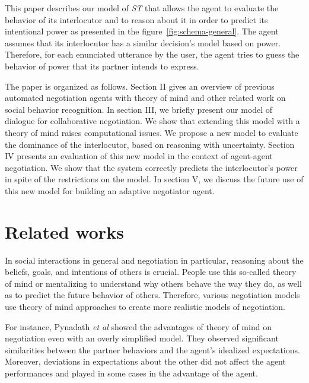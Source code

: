 \documentclass[conference, letterpaper]{IEEEtran}
\begin{document}
		This paper describes our model of \emph{ST} that allows the agent to evaluate the behavior of its interlocutor and to reason about it in order to predict its intentional power as presented in the figure~\ref{fig:schema-general}. The agent assumes that its interlocutor has a similar decision's model based on power. Therefore, for each enunciated utterance by the user, the agent tries to guess the behavior of power that its partner intends to express. 

		The paper is organized as follows. Section II gives an overview of previous automated negotiation agents with theory of mind and other related work on social behavior recognition. In section III, we briefly present our model of dialogue for collaborative negotiation. We show that extending this model with a theory of mind raises computational issues. We propose a new model to evaluate the dominance of the interlocutor, based on reasoning with uncertainty. Section IV presents an evaluation of this new model in the context of agent-agent negotiation. We show that the system correctly predicts the interlocutor's power in spite of the restrictions on the model. In section V, we discuss the future use of this new model for building an adaptive negotiator agent.
	
	
	\section{Related works}
	
	In social interactions in general and negotiation in particular, reasoning about the beliefs, goals, and intentions of others is crucial. People use this so-called theory of mind \cite{premack1978does} or mentalizing to understand why others behave the way they do, as well as to predict the future behavior of others. Therefore, various negotiation models use theory of mind approaches to create  more realistic models of negotiation. 
	
	For instance, Pynadath \textit{et al} \cite{pynadath2013you} showed the advantages of theory of mind on negotiation even with an overly simplified model. They observed significant similarities between	the partner behaviors and the agent's idealized expectations. Moreover, deviations in expectations about the other did not affect the agent performances and played in some cases in the advantage of the agent.
	
\end{document}
